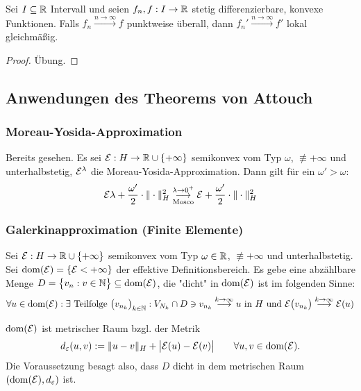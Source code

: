 \begin{lemma}
	Sei $I\subseteq\mathbb{R}$ Intervall und seien $f_n,f:I\to\mathbb{R}$ stetig differenzierbare, konvexe Funktionen.
	Falls $f_n\overset{n\to\infty}{\longrightarrow} f$ punktweise überall,
	dann $f_n'\overset{n\to\infty}{\longrightarrow} f'$ lokal gleichmäßig.
\end{lemma}

\begin{proof}
	Übung.
\end{proof}

\subsection{Anwendungen des Theorems von Attouch} %
\subsubsection{Moreau-Yosida-Approximation}
Bereits gesehen.
Es sei $\mathcal{E}:H\to\mathbb{R}\cup\lbrace+\infty\rbrace$ semikonvex vom Typ $\omega$, $\not\equiv+\infty$ und unterhalbstetig,
$\mathcal{E}^\lambda$ die Moreau-Yosida-Approximation.
Dann gilt für ein $\omega'>\omega$:
\begin{align*}
	\mathcal{E}\lambda+\frac{\omega'}{2}\cdot\Vert\cdot\Vert_H^2
	\underset{\text{Mosco}}{\overset{\lambda\to 0^+}{\longrightarrow}}
	\mathcal{E}+\frac{\omega'}{2}\cdot\Vert\cdot\Vert_H^2
\end{align*}

\subsubsection{Galerkinapproximation (Finite Elemente)}
Sei $\mathcal{E}:H\to\mathbb{R}\cup\lbrace+\infty\rbrace$ semikonvex vom Typ $\omega\in\mathbb{R}$, $\not\equiv+\infty$ und unterhalbstetig.
Sei $\operatorname{dom}(\mathcal{E})=\lbrace\mathcal{E}<+\infty\rbrace$ der effektive Definitionsbereich.
Es gebe eine abzählbare Menge $D=\big\lbrace v_n:v\in\mathbb{N}\big\rbrace\subseteq\operatorname{dom}(\mathcal{E})$, die "dicht" in $\operatorname{dom}(\mathcal{E})$ ist im folgenden Sinne:
\begin{align*}
	\forall u\in\operatorname{dom}(\mathcal{E}):\exists\text{ Teilfolge }\big(v_{n_k}\big)_{k\in\mathbb{N}}:
	V_{N_k}\cap D\ni v_{n_k}\overset{k\to\infty}{\longrightarrow} u\text{ in }H
	\text{ und }\mathcal{E}\big(v_{n_k}\big)\overset{k\to\infty}{\longrightarrow}\mathcal{E}(u)
\end{align*}

$\operatorname{dom}(\mathcal{E})$ ist metrischer Raum bzgl. der Metrik
\begin{align*}
	d_\varepsilon(u,v):=\Vert u-v\Vert_H+\big|\mathcal{E}(u)-\mathcal{E}(v)\big|\qquad\forall u,v\in\operatorname{dom}(\mathcal{E}).
\end{align*}
Die Voraussetzung besagt also, dass $D$ dicht in dem metrischen Raum $(\operatorname{dom}(\mathcal{E}),d_\varepsilon)$ ist.

